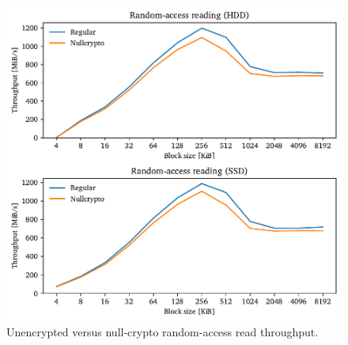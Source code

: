 \begin{figure}[htb!]
	\center
	\includegraphics[scale=1]{../fig/performance.hwexperiments.nullcryptorand.pdf}
	\caption[
		Unencrypted versus null-crypto random-access read throughput
	]{
		Unencrypted versus null-crypto random-access read throughput. 
	}
	\label{fig:performance.hwexperiments.nullcryptorand}
\end{figure}

